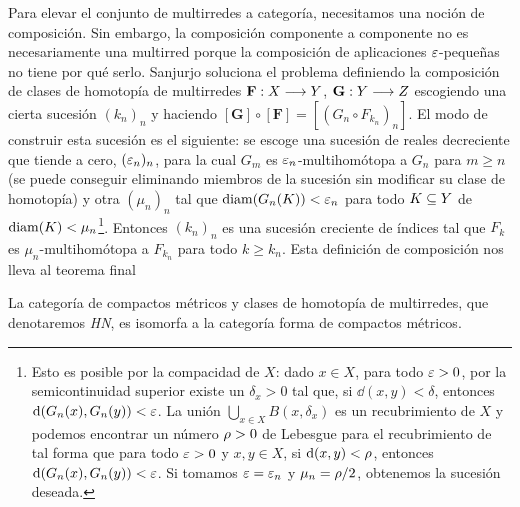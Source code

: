Para elevar el conjunto de multirredes a categoría, necesitamos una noción de composición. Sin embargo, la composición componente a componente no es necesariamente una multirred porque la composición de aplicaciones $ \varepsilon  $-peque\~nas no tiene por qué serlo. Sanjurjo soluciona el problema definiendo la composición de clases de homotopía de multirredes $ \mathbf{F}:X\longrightarrow Y  $, $ \mathbf{G}:Y\longrightarrow Z  $ escogiendo una cierta sucesión $ (k_n)_n  $  y haciendo $ [\mathbf{G}]\circ [\mathbf{F}] = [(G_n \circ F_{k_n})_n] $. El modo de construir esta sucesión es el siguiente: se escoge una sucesión de reales decreciente que tiende a cero, $ (\varepsilon_n)_n  $, para la cual $ G_m  $ es $ \varepsilon_{n} $-multihomótopa a $ G_{n} $ para $ m\geq n  $ (se puede conseguir eliminando miembros de la sucesión sin modificar su clase de homotopía) y otra $ (\mu_n)_n  $ tal que $ \operatorname{diam}(G_n(K))<\varepsilon_n  $ para todo $ K\subseteq Y  $ de $ \operatorname{diam}(K)<\mu_n  $\footnote{Esto es posible por la compacidad de $ X  $: dado $ x\in X  $, para todo $ \varepsilon>0 $, por la semicontinuidad superior existe un $ \delta_x>0  $ tal que, si $ \dd(x,y)<\delta  $, entonces $ \dd(G_n(x),G_n(y))<\varepsilon  $. La unión $ \bigcup_{x\in X}B(x,\delta_x) $ es un recubrimiento de $ X  $ y podemos encontrar un número $ \rho>0  $ de Lebesgue para el recubrimiento de tal forma que para todo $ \varepsilon>0  $ y $ x,y\in X  $, si $ \dd(x,y)<\rho  $, entonces $ \dd(G_n(x),G_n(y))<\varepsilon  $. Si tomamos $ \varepsilon=\varepsilon_n  $ y $ \mu_n = \rho/2 $, obtenemos la sucesión deseada.}.  Entonces $ (k_n)_n $ es una sucesión creciente de índices tal que $ F_k  $ es $ \mu_n  $-multihomótopa a $ F_{k_n} $ para todo $ k\geq k_n  $. Esta definición de composición nos lleva al teorema final 
\begin{theorem}[Sanjurjo]
  La categoría de compactos métricos y clases de homotopía de multirredes, que denotaremos \emph{HN}, es isomorfa a la categoría forma de compactos métricos.
\end{theorem}
